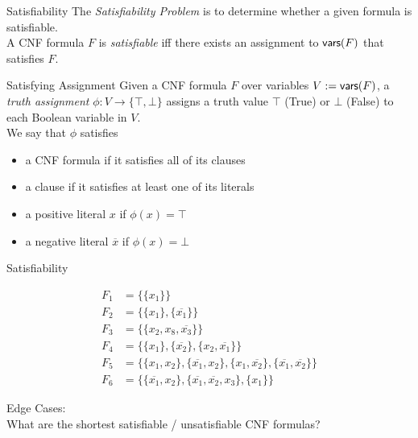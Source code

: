 \documentclass[t]{sdqbeamer}
\begin{document}
\begin{frame}{Satisfiability}
	The \emph{Satisfiability Problem} is to determine whether a given formula is satisfiable.\\
	A CNF formula $F$ is \emph{satisfiable} iff there exists an assignment to $\textsf{vars} (F)$ that satisfies $F$.
	\begin{block}{Satisfying Assignment}
		Given a CNF formula $F$ over variables $V := \textsf{vars} (F)$, a \emph{truth assignment} $\phi : V \rightarrow \{ \top, \bot \}$ assigns a truth value $\top$ (True) or $\bot$ (False) to each Boolean variable in $V$.\\[1em]
		We say that $\phi$ satisfies
			\begin{itemize}
				\item a CNF formula if it satisfies all of its clauses
				\item a clause if it satisfies at least one of its literals
				\item a positive literal $x$ if $\phi(x)=\top$
				\item a negative literal $\overline{x}$ if $\phi(x)=\bot$
			\end{itemize}
	\end{block}
\end{frame}

\begin{frame}{Satisfiability}
\begin{example}
	\vspace*{-3ex}
	\begin{align*}
		F_1 &= \{ \{ x_1 \} \}\\[1ex]
		F_2 &= \{ \{ x_1 \}, \{ \overline{x_1} \} \}\\[1ex]
		F_3 &= \{ \{ x_2, x_8, \overline{x_3} \} \}\\[1ex]
		F_4 &= \{ \{ x_1 \}, \{ \overline{x_2} \}, \{ x_2, \overline{x_1} \} \}\\[1ex]
		F_5 &= \{ \{ x_1, x_2 \}, \{ \overline{x_1}, x_2 \}, \{ x_1, \overline{x_2} \}, \{ \overline{x_1}, \overline{x_2} \} \}\\[1ex]
		F_6 &= \{ \{ \overline{x_1}, x_2 \}, \{ \overline{x_1}, \overline {x_2}, x_3 \}, \{ x_1 \} \}
	\end{align*}
\end{example}
\pause
\begin{alert}{Edge Cases:\\}
	What are the shortest satisfiable / unsatisfiable CNF formulas?
\end{alert}
\end{frame}
\end{document}
